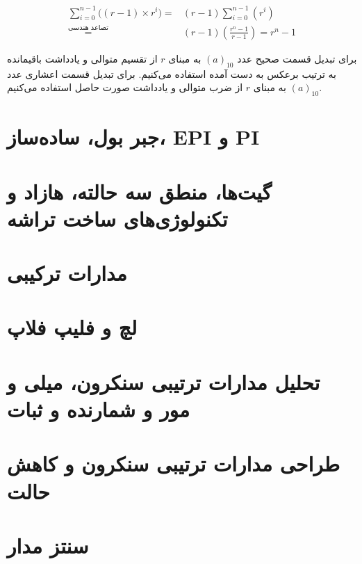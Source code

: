 \documentclass[a5paper]{article}
\begin{document}
\begin{equation}\begin{split}
  \sum_{i=0}^{n-1}\big((r-1) \times r^{i}\big) = &(r-1)\sum_{i=0}^{n-1}(r^{i})\\
  \stackrel{\text{تصاعد هندسی}}{=} &(r-1)(\frac{r^{n}-1}{r-1}) = r^{n} -1
\end{split}\end{equation}

برای تبدیل قسمت صحیح عدد $(a)_{10}$ به مبنای $r$ از تقسیم متوالی و یادداشت باقیمانده به ترتیب برعکس به دست آمده استفاده می‌کنیم.
برای تبدیل قسمت اعشاری عدد $(a)_{10}$ به مبنای $r$ از ضرب متوالی و یادداشت صورت حاصل استفاده می‌کنیم.

\section{جبر بول، ساده‌ساز، EPI و PI}

\section{گیت‌ها، منطق سه حالته، هازاد و تکنولوژی‌های ساخت تراشه}

\section{مدارات ترکیبی}

\section{لچ و فلیپ فلاپ}

\section{تحلیل مدارات ترتیبی سنکرون، میلی و مور و شمارنده و ثبات}

\section{طراحی مدارات ترتیبی سنکرون و کاهش حالت}

\section{سنتز مدار}
\end{document}
